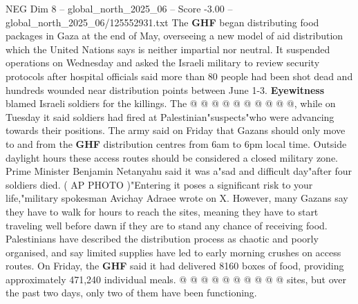 \begin{textsample}{NEG Dim 8 – global\_north\_2025\_06 – Score -3.00 – global\_north\_2025\_06/125552931.txt}
The \textbf{GHF} began distributing food packages in Gaza at the end of May, overseeing a new model of aid distribution which the United Nations says is neither impartial nor neutral.
It suspended operations on Wednesday and asked the Israeli military to review security protocols after hospital officials said more than 80 people had been shot dead and hundreds wounded near distribution points between June 1-3. \textbf{Eyewitness} blamed Israeli soldiers for the killings.
The @ @ @ @ @ @ @ @ @ @, while on Tuesday it said soldiers had fired at Palestinian"suspects"who were advancing towards their positions.
The army said on Friday that Gazans should only move to and from the \textbf{GHF} distribution centres from 6am to 6pm local time.
Outside daylight hours these access routes should be considered a closed military zone.
Prime Minister Benjamin Netanyahu said it was a"sad and difficult day"after four soldiers died. ( AP PHOTO )"Entering it poses a significant risk to your life,"military spokesman Avichay Adraee wrote on X.
However, many Gazans say they have to walk for hours to reach the sites, meaning they have to start traveling well before dawn if they are to stand any chance of receiving food.
Palestinians have described the distribution process as chaotic and poorly organised, and say limited supplies have led to early morning crushes on access routes.
On Friday, the \textbf{GHF} said it had delivered 8160 boxes of food, providing approximately 471,240 individual meals. @ @ @ @ @ @ @ @ @ @ sites, but over the past two days, only two of them have been functioning.

\end{textsample}
